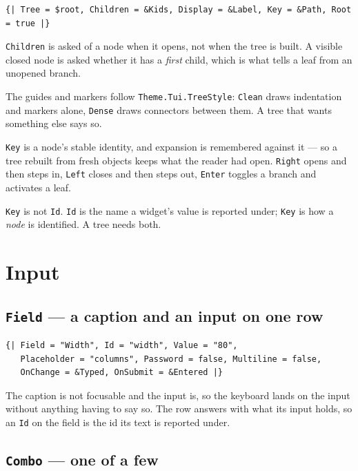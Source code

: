 \documentclass[11pt,a4paper,twoside,openany]{book}
\newcommand{\code}[1]{\texttt{\small #1}}
\begin{document}
\begin{lstlisting}
{| Tree = $root, Children = &Kids, Display = &Label, Key = &Path, Root = true |}
\end{lstlisting}

\code{Children} is asked of a node when it opens, not when the tree is built. A
visible closed node is asked whether it has a \emph{first} child, which is what
tells a leaf from an unopened branch.

The guides and markers follow \code{Theme.Tui.TreeStyle}: \code{Clean} draws
indentation and markers alone, \code{Dense} draws connectors between them. A tree that
wants something else says so.

\code{Key} is a node's stable identity, and expansion is remembered against it ---
so a tree rebuilt from fresh objects keeps what the reader had open. \code{Right}
opens and then steps in, \code{Left} closes and then steps out, \code{Enter}
toggles a branch and activates a leaf.

\begin{warnbox}
\code{Key} is not \code{Id}. \code{Id} is the name a widget's value is reported
under; \code{Key} is how a \emph{node} is identified. A tree needs both.
\end{warnbox}

\section{Input}

\subsection{\texttt{Field} --- a caption and an input on one row}

\begin{lstlisting}
{| Field = "Width", Id = "width", Value = "80",
   Placeholder = "columns", Password = false, Multiline = false,
   OnChange = &Typed, OnSubmit = &Entered |}
\end{lstlisting}

The caption is not focusable and the input is, so the keyboard lands on the input
without anything having to say so. The row answers with what its input holds, so
an \code{Id} on the field is the id its text is reported under.

\subsection{\texttt{Combo} --- one of a few}
\end{document}
